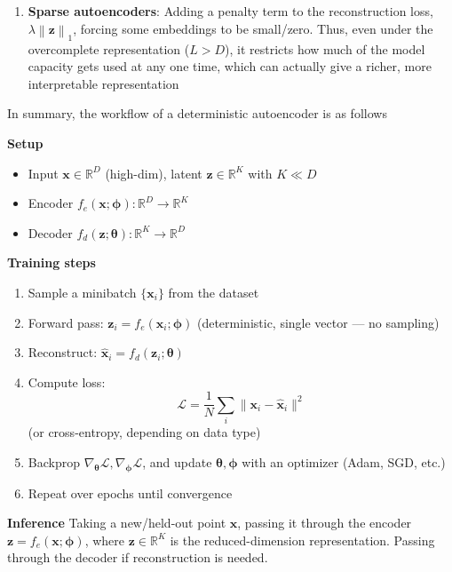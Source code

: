 \documentclass[11pt]{article}
\begin{document}
\begin{enumerate}
    \item \textbf{Sparse autoencoders}: Adding a penalty term to the reconstruction loss, $\lambda \left\| \boldsymbol{z} \right\|_1$, forcing some embeddings to be small/zero. Thus, even under the overcomplete representation ($L > D$), it restricts how much of the model capacity gets used at any one time, which can actually give a richer, more interpretable representation
\end{enumerate}

In summary, the workflow of a deterministic autoencoder is as follows

\textbf{Setup}\begin{itemize}
    \item Input $\boldsymbol{x} \in \mathbb{R}^D$ (high-dim), latent $\boldsymbol{z} \in \mathbb{R}^K$ with $K \ll D$
    \item Encoder $f_e(\boldsymbol{x};\boldsymbol{\phi}): \mathbb{R}^D \to \mathbb{R}^K$
    \item Decoder $f_d(\boldsymbol{z};\boldsymbol{\theta}): \mathbb{R}^K \to \mathbb{R}^D$
\end{itemize}

\textbf{Training steps}
\begin{enumerate}
    \item Sample a minibatch $\{\boldsymbol{x}_i\}$ from the dataset
    \item Forward pass: $\boldsymbol{z}_i = f_e(\boldsymbol{x}_i;\boldsymbol{\phi})$ (deterministic, single vector --- no sampling)
    \item Reconstruct: $\hat{\boldsymbol{x}}_i = f_d(\boldsymbol{z}_i;\boldsymbol{\theta})$
    \item Compute loss:
    \[
        \mathcal{L} = \frac{1}{N}\sum_{i} \|\boldsymbol{x}_i - \hat{\boldsymbol{x}}_i\|^2
    \]
    (or cross-entropy, depending on data type)
    \item Backprop $\nabla_{\boldsymbol{\theta}} \mathcal{L}, \nabla_{\boldsymbol{\phi}} \mathcal{L}$, and update $\boldsymbol{\theta}, \boldsymbol{\phi}$ with an optimizer (Adam, SGD, etc.)
    \item Repeat over epochs until convergence
\end{enumerate}

\textbf{Inference}
Taking a new/held-out point $\boldsymbol{x}$, passing it through the encoder $\boldsymbol{z} = f_e(\boldsymbol{x};\boldsymbol{\phi})$, where $\boldsymbol{z} \in \mathbb{R}^K$ is the reduced-dimension representation. Passing through the decoder if reconstruction is needed.
\end{document}
